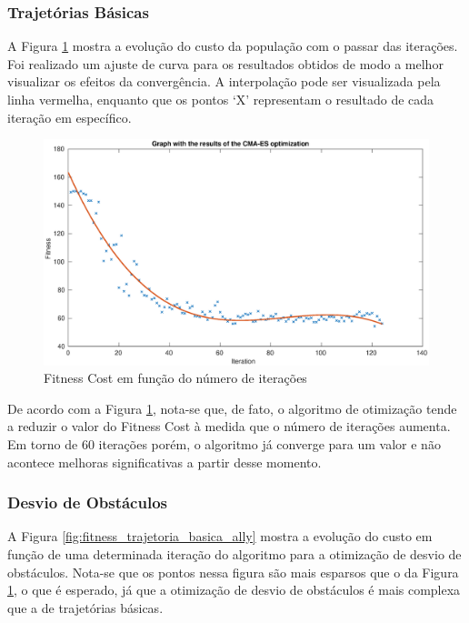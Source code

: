 \documentclass[a4paper,12pt]{article}
\begin{document}
\subsubsection{Trajetórias Básicas}

A Figura \ref{fig:fitness_trajetoria_basica} mostra a evolução do custo da população com o passar das iterações. Foi realizado um ajuste de curva para os resultados obtidos de modo a melhor visualizar os efeitos da convergência. A interpolação pode ser visualizada pela linha vermelha, enquanto que os pontos `X’ representam o resultado de cada iteração em específico.

\begin{figure}[H]
	\centering
	\includegraphics[width=1.0\textwidth]{figures/CMA-ES_Fitness_Results.eps}
	\caption{Fitness Cost em função do número de iterações}
	\label{fig:fitness_trajetoria_basica}
\end{figure}

De acordo com a Figura \ref{fig:fitness_trajetoria_basica}, nota-se que, de fato, o algoritmo de otimização tende a reduzir o valor do Fitness Cost à medida que o número de iterações aumenta. Em torno de 60 iterações porém, o algoritmo já converge para um valor e não acontece melhoras significativas a partir desse momento.

\subsubsection{Desvio de Obstáculos}

A Figura \ref{fig:fitness_trajetoria_basica_ally} mostra a evolução do custo em função de uma determinada iteração do algoritmo para a otimização de desvio de obstáculos. Nota-se que os pontos nessa figura são mais esparsos que o da Figura \ref{fig:fitness_trajetoria_basica}, o que é esperado, já que a otimização de desvio de obstáculos é mais complexa que a de trajetórias básicas.
\end{document}
